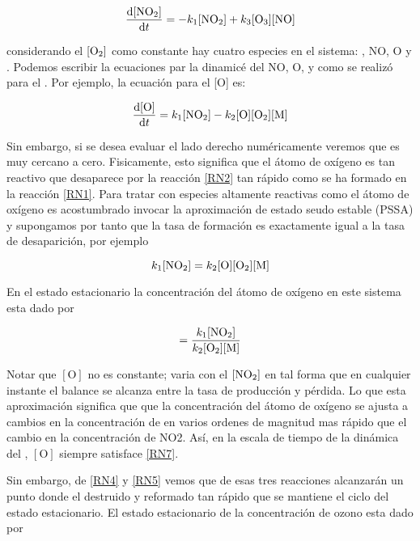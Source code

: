 \begin{equation}
\frac{\mathrm{d}[\ce{NO2}]}{\mathrm{d}t}=-k_1[\ce{NO2}]+k_3[\ce{O3}][\ce{NO}]
\label{RN4}
\end{equation}

considerando el $[\ce{O2}]$ como constante hay cuatro especies en el sistema: , NO, O y . Podemos escribir la ecuaciones par la dinamicé del NO, O, y  como se realizó para el . Por ejemplo, la ecuación para el  [O] es:

\begin{equation}
\frac{\mathrm{d}[\ce{O}]}{\mathrm{d}t}=k_1[\ce{NO2}]-k_2[\ce{O}][\ce{O2}][\ce{M}]
\label{RN5}
\end{equation}

Sin embargo, si se desea evaluar el lado derecho numéricamente veremos que es muy cercano a cero. Fisicamente, esto significa que el átomo de oxígeno es tan reactivo que desaparece por la reacción \ref{RN2}  tan rápido como se ha formado en la reacción \ref{RN1}. Para tratar con especies altamente reactivas como el átomo de oxígeno es acostumbrado invocar la aproximación de estado seudo estable (PSSA) y supongamos por tanto que la tasa de formación es exactamente igual a la tasa de desaparición, por ejemplo

\begin{equation*}
k_1[\ce{NO2}]=k_2[\ce{O}][\ce{O2}][\ce{M}]
\end{equation*}

En el estado estacionario la concentración del átomo de oxígeno en este sistema esta dado por


\begin{equation}
[\ce{O}]=\frac{k_1[\ce{NO2}]}{k_2[\ce{O2}][\ce{M}]}
\label{RN7}
\end{equation}

Notar que $[\textrm{O}]$ no es constante; varia con el $[\ce{NO2}]$ en tal forma que en cualquier instante el balance se alcanza entre la tasa de producción y pérdida. Lo que esta aproximación significa que que la concentración del átomo de oxígeno se ajusta a cambios en la concentración de  en varios ordenes de magnitud mas rápido que el cambio en la concentración de NO2. Así, en la escala de tiempo de la dinámica del , $[\textrm{O}]$ siempre satisface \ref{RN7}.


Sin embargo, de \ref{RN4} y \ref{RN5} vemos que de esas tres reacciones alcanzarán un punto donde el  destruido y reformado tan rápido que se mantiene el ciclo del estado estacionario. El estado estacionario de la concentración de ozono esta dado por

